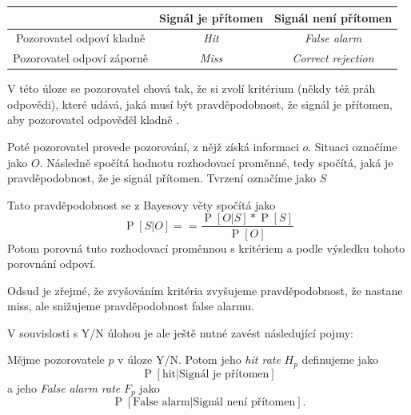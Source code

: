 \bigskip\noindent
\begin{center}
\begin{tabular}{ccc}
\hline
\hline
& Signál je přítomen & Signál není přítomen \\
\hline
Pozorovatel odpoví kladně &{\it Hit}&{\it False alarm} \\
Pozorovatel odpoví záporně &{\it Miss}&{\it Correct rejection}\\
\hline
\hline
\end{tabular}
\end{center}
\bigskip
{}

 V této úloze se pozorovatel chová tak,
že si zvolí kritérium (někdy též práh odpovědi), které udává, jaká musí být
pravděpodobnost, že signál je přítomen, aby pozorovatel odpověděl kladně \citep[kapitola 1.7]{GreenSDT}.

\def\P#1{\operatorname{P}\left[#1\right]}
\def\E#1{\mathbb{E}\left[#1\right]}
\def\tP#1{\P{\text{#1}}}

Poté pozorovatel provede pozorování, z nějž získá informaci $o$. Situaci
 označíme jako $O$. Následně spočítá hodnotu
rozhodovací proměnné, tedy spočítá, jaká je pravděpodobnost, že je signál
přítomen. Tvrzení  označíme jako $S$

Tato pravděpodobnost se z Bayesovy věty spočítá jako 
\begin{equation*}
\P{S| O} = =\frac{\P{O| S}*\P{S}}{\P{O}} 
\end{equation*}
Potom porovná tuto rozhodovací proměnnou s kritériem a podle výsledku tohoto
porovnání odpoví.

Odsud je zřejmé, že zvyšováním kritéria zvyšujeme pravděpodobnost, že nastane
miss, ale snižujeme pravděpodobnost false alarmu.

V souvislosti s Y/N úlohou je ale ještě nutné zavést následující pojmy:

\begin{definice}\label{hitrate}
Mějme pozorovatele $p$ v úloze Y/N. Potom jeho \emph{hit rate\/} $H_p$ definujeme jako $$\P{\text{hit}|\text{Signál je přítomen}}$$ a jeho \emph{False alarm rate\/} $F_p$ jako $$\P{\text{False alarm}|\text{Signál není přítomen}}.$$
\end{definice}

